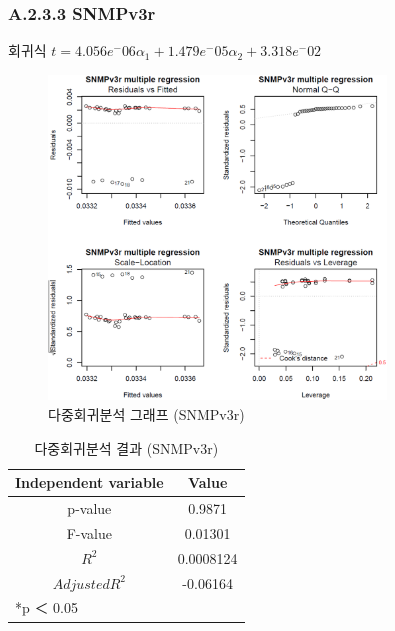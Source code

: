 \documentclass[11pt
  , a4paper
  , article
  , oneside
]{memoir}
\begin{document}
\subsubsection{A.2.3.3 SNMPv3r}
\centering 회귀식 $ t=4.056e^-06\alpha_1 + 1.479e^-05\alpha_2 + 3.318e^-02$ 
   　
\begin{figure}[h!]
  \centering
  \includegraphics[width=0.8\textwidth]{./images/v3r.eps}
  \caption{다중회귀분석 그래프 (SNMPv3r)}
\end{figure}

\begin{table}[!h]
\begin{center}
\begin{tabular}{c|c}\hline
Independent variable & Value  \\ \hline\hline
p-value &  0.9871\\ 
F-value &  0.01301\\ 
$  R^2  $ &  0.0008124\\ 
$ Adjusted R^2 $ & -0.06164 \\ \hline
\multicolumn{2}{l}{*p ＜ 0.05} \\ \hline\hline
\end{tabular}
\caption{다중회귀분석 결과 (SNMPv3r)}
\end{center}
\end{table} 
\clearpage
\end{document}
